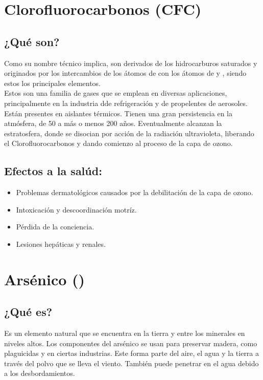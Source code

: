 \documentclass[letterpaper, 12pt]{article}
\begin{document}
    \newpage
        \begin{justify}
    \section{Clorofluorocarbonos (CFC)}
    \subsection{¿Qué son?}
    Como su nombre técnico implica, son derivados de los hidrocarburos saturados y originados por los intercambios de los átomos de  con los átomos de  y 
    , siendo estos los principales elementos.
    \\ \newline
    Estos son una familia de gases que se emplean en diversas aplicaciones, principalmente en la industria dde refrigeración y de propelentes de aerosoles.  Están presentes en aislantes térmicos.
    Tienen una gran persistencia en la atmósfera, de 50 a más o menos 200 años. Eventualmente alcanzan la estratosfera, donde se disocian por acción de la radiación ultravioleta, liberando el Clorofluorocarbonos
    y dando comienzo al proceso de la capa de ozono.
    \subsection{Efectos a la salúd:}
    \begin{itemize}
        \item Problemas dermatológicos causados por la debilitación de la capa de ozono.
        \item Intoxicación y descoordinación motríz.
        \item Pérdida de la conciencia.
        \item Lesiones hepáticas y renales.
    \end{itemize}
    \section{Arsénico ()}
    \subsection{¿Qué es?}
    Es un elemento natural que se encuentra en la tierra y entre los minerales en niveles altos. Los componentes del arsénico se usan para preservar madera, como plaguicidas y en ciertas industrias. Este forma parte del aire, el agua y la tierra a través
    del polvo que se lleva el viento. También puede penetrar en el agua debido a los desbordamientos. 

\end{justify}
\end{document}
